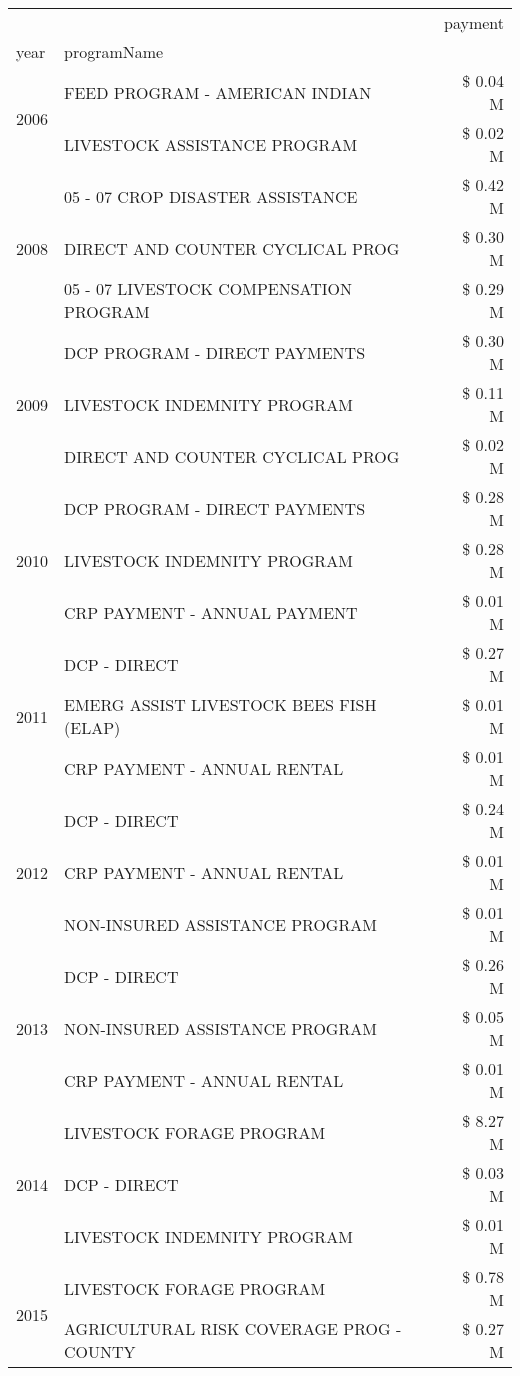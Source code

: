 \begin{tabular}{llr}
\toprule
 &  & payment \\
year & programName &  \\
\midrule
\multirow[t]{2}{*}{2006} & FEED PROGRAM - AMERICAN INDIAN & \$ 0.04 M \\
 & LIVESTOCK ASSISTANCE PROGRAM & \$ 0.02 M \\
\cline{1-3}
\multirow[t]{3}{*}{2008} & 05 - 07 CROP DISASTER ASSISTANCE & \$ 0.42 M \\
 & DIRECT AND COUNTER CYCLICAL PROG & \$ 0.30 M \\
 & 05 - 07 LIVESTOCK COMPENSATION PROGRAM & \$ 0.29 M \\
\cline{1-3}
\multirow[t]{3}{*}{2009} & DCP PROGRAM - DIRECT PAYMENTS & \$ 0.30 M \\
 & LIVESTOCK INDEMNITY PROGRAM & \$ 0.11 M \\
 & DIRECT AND COUNTER CYCLICAL PROG & \$ 0.02 M \\
\cline{1-3}
\multirow[t]{3}{*}{2010} & DCP PROGRAM - DIRECT PAYMENTS & \$ 0.28 M \\
 & LIVESTOCK INDEMNITY PROGRAM & \$ 0.28 M \\
 & CRP PAYMENT - ANNUAL PAYMENT & \$ 0.01 M \\
\cline{1-3}
\multirow[t]{3}{*}{2011} & DCP - DIRECT & \$ 0.27 M \\
 & EMERG ASSIST LIVESTOCK BEES FISH (ELAP) & \$ 0.01 M \\
 & CRP PAYMENT - ANNUAL RENTAL & \$ 0.01 M \\
\cline{1-3}
\multirow[t]{3}{*}{2012} & DCP - DIRECT & \$ 0.24 M \\
 & CRP PAYMENT - ANNUAL RENTAL & \$ 0.01 M \\
 & NON-INSURED ASSISTANCE PROGRAM & \$ 0.01 M \\
\cline{1-3}
\multirow[t]{3}{*}{2013} & DCP - DIRECT & \$ 0.26 M \\
 & NON-INSURED ASSISTANCE PROGRAM & \$ 0.05 M \\
 & CRP PAYMENT - ANNUAL RENTAL & \$ 0.01 M \\
\cline{1-3}
\multirow[t]{3}{*}{2014} & LIVESTOCK FORAGE PROGRAM & \$ 8.27 M \\
 & DCP - DIRECT & \$ 0.03 M \\
 & LIVESTOCK INDEMNITY PROGRAM & \$ 0.01 M \\
\cline{1-3}
\multirow[t]{3}{*}{2015} & LIVESTOCK FORAGE PROGRAM & \$ 0.78 M \\
 & AGRICULTURAL RISK COVERAGE PROG - COUNTY & \$ 0.27 M \\

\end{tabular}
